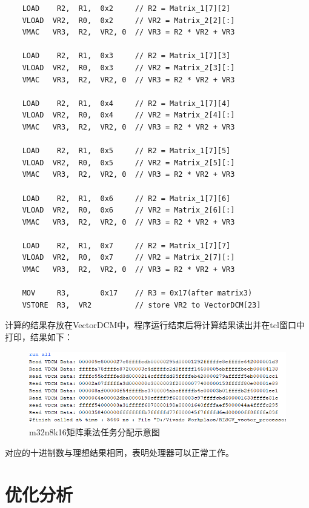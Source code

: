 \documentclass[UTF8]{ctexart}
\begin{document}
\begin{lstlisting}
    LOAD    R2,  R1,  0x2     // R2 = Matrix_1[7][2]
    VLOAD  VR2,  R0,  0x2     // VR2 = Matrix_2[2][:]
    VMAC   VR3,  R2,  VR2, 0  // VR3 = R2 * VR2 + VR3

    LOAD    R2,  R1,  0x3     // R2 = Matrix_1[7][3]
    VLOAD  VR2,  R0,  0x3     // VR2 = Matrix_2[3][:]
    VMAC   VR3,  R2,  VR2, 0  // VR3 = R2 * VR2 + VR3

    LOAD    R2,  R1,  0x4     // R2 = Matrix_1[7][4]
    VLOAD  VR2,  R0,  0x4     // VR2 = Matrix_2[4][:]
    VMAC   VR3,  R2,  VR2, 0  // VR3 = R2 * VR2 + VR3

    LOAD    R2,  R1,  0x5     // R2 = Matrix_1[7][5]
    VLOAD  VR2,  R0,  0x5     // VR2 = Matrix_2[5][:]
    VMAC   VR3,  R2,  VR2, 0  // VR3 = R2 * VR2 + VR3

    LOAD    R2,  R1,  0x6     // R2 = Matrix_1[7][6]
    VLOAD  VR2,  R0,  0x6     // VR2 = Matrix_2[6][:]
    VMAC   VR3,  R2,  VR2, 0  // VR3 = R2 * VR2 + VR3

    LOAD    R2,  R1,  0x7     // R2 = Matrix_1[7][7]
    VLOAD  VR2,  R0,  0x7     // VR2 = Matrix_2[7][:]
    VMAC   VR3,  R2,  VR2, 0  // VR3 = R2 * VR2 + VR3

    MOV     R3,       0x17    // R3 = 0x17(after matrix3)
    VSTORE  R3,  VR2          // store VR2 to VectorDCM[23]

\end{lstlisting}

计算的结果存放在VectorDCM中，程序运行结束后将计算结果读出并在tcl窗口中打印，结果如下：

\begin{figure}[htbp]
    \centering
    \includegraphics[width=16cm]{pic/matrix_result.png}
    \caption{m32n8k16矩阵乘法任务分配示意图}
\end{figure}

对应的十进制数与理想结果相同，表明处理器可以正常工作。

\section{优化分析}
\end{document}
